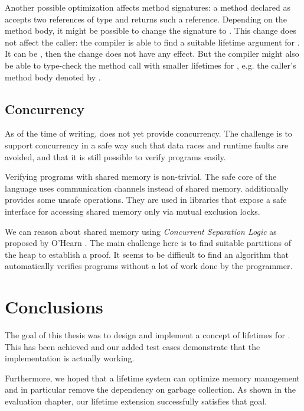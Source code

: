 \begin{sloppypar}
Another possible optimization affects method signatures:
a method declared as  accepts two references of type  and returns such a reference.
Depending on the method body, it might be possible to change the signature to .
This change does not affect the caller:
the compiler is able to find a suitable lifetime argument for .
It can be \whileyinline{*}, then the change does not have any effect.
But the compiler might also be able to type-check the method call with smaller lifetimes for , e.g. the caller's method body denoted by .
\end{sloppypar}


\subsection*{Concurrency}
As of the time of writing, \whiley does not yet provide concurrency.
The challenge is to support concurrency in a safe way such that data races and runtime faults are avoided, and that it is still possible to verify programs easily.

Verifying programs with shared memory is non-trivial.
The safe core of the \rust language uses communication channels instead of shared memory.
\rust additionally provides some unsafe operations.
They are used in libraries that expose a safe interface for accessing shared memory only via mutual exclusion locks.

We can reason about shared memory using \emph{Concurrent Separation Logic} as proposed by O’Hearn \cite{o2007resources}.
The main challenge here is to find suitable partitions of the heap to establish a proof.
It seems to be difficult to find an algorithm that automatically verifies programs without a lot of work done by the programmer.


\section{Conclusions}
The goal of this thesis was to design and implement a concept of lifetimes for \whiley.
This has been achieved and our added test cases demonstrate that the implementation is actually working.

Furthermore, we hoped that a lifetime system can optimize memory management and in particular remove the dependency on garbage collection.
As shown in the evaluation chapter, our lifetime extension successfully satisfies that goal.
